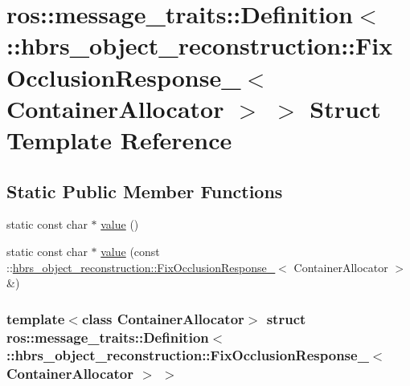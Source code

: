 \hypertarget{structros_1_1message__traits_1_1_definition_3_01_1_1hbrs__object__reconstruction_1_1_fix_occlusib5b6e66ca1ffd6b8ad6da8f01aae4908}{\section{ros\-:\-:message\-\_\-traits\-:\-:\-Definition$<$ \-:\-:hbrs\-\_\-object\-\_\-reconstruction\-:\-:\-Fix\-Occlusion\-Response\-\_\-$<$ \-Container\-Allocator $>$ $>$ \-Struct \-Template \-Reference}
\label{structros_1_1message__traits_1_1_definition_3_01_1_1hbrs__object__reconstruction_1_1_fix_occlusib5b6e66ca1ffd6b8ad6da8f01aae4908}
}
\subsection*{\-Static \-Public \-Member \-Functions}
\begin{DoxyCompactItemize}
\item 
static const char $\ast$ \hyperlink{structros_1_1message__traits_1_1_definition_3_01_1_1hbrs__object__reconstruction_1_1_fix_occlusib5b6e66ca1ffd6b8ad6da8f01aae4908_afa5762ac8d7163e8e85a0affe7f954e8}{value} ()
\item 
static const char $\ast$ \hyperlink{structros_1_1message__traits_1_1_definition_3_01_1_1hbrs__object__reconstruction_1_1_fix_occlusib5b6e66ca1ffd6b8ad6da8f01aae4908_a35de41c6587c9666d83a843522361389}{value} (const \-::\hyperlink{structhbrs__object__reconstruction_1_1_fix_occlusion_response__}{hbrs\-\_\-object\-\_\-reconstruction\-::\-Fix\-Occlusion\-Response\-\_\-}$<$ \-Container\-Allocator $>$ \&)
\end{DoxyCompactItemize}
\subsubsection*{template$<$class Container\-Allocator$>$ struct ros\-::message\-\_\-traits\-::\-Definition$<$ \-::hbrs\-\_\-object\-\_\-reconstruction\-::\-Fix\-Occlusion\-Response\-\_\-$<$ Container\-Allocator $>$ $>$}



